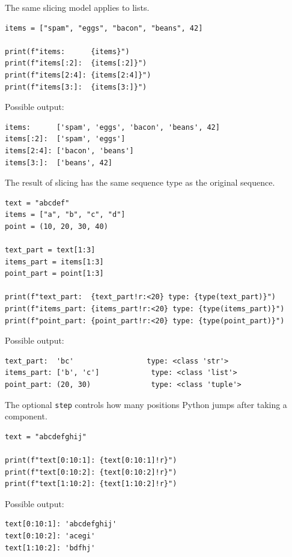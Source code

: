 The same slicing model applies to lists.

\begin{verbatim}
items = ["spam", "eggs", "bacon", "beans", 42]

print(f"items:      {items}")
print(f"items[:2]:  {items[:2]}")
print(f"items[2:4]: {items[2:4]}")
print(f"items[3:]:  {items[3:]}")
\end{verbatim}

Possible output:

\begin{verbatim}
items:      ['spam', 'eggs', 'bacon', 'beans', 42]
items[:2]:  ['spam', 'eggs']
items[2:4]: ['bacon', 'beans']
items[3:]:  ['beans', 42]
\end{verbatim}

The result of slicing has the same sequence type as the original sequence.

\begin{verbatim}
text = "abcdef"
items = ["a", "b", "c", "d"]
point = (10, 20, 30, 40)

text_part = text[1:3]
items_part = items[1:3]
point_part = point[1:3]

print(f"text_part:  {text_part!r:<20} type: {type(text_part)}")
print(f"items_part: {items_part!r:<20} type: {type(items_part)}")
print(f"point_part: {point_part!r:<20} type: {type(point_part)}")
\end{verbatim}

Possible output:

\begin{verbatim}
text_part:  'bc'                 type: <class 'str'>
items_part: ['b', 'c']            type: <class 'list'>
point_part: (20, 30)              type: <class 'tuple'>
\end{verbatim}

The optional \texttt{step} controls how many positions Python jumps after taking a component.

\begin{verbatim}
text = "abcdefghij"

print(f"text[0:10:1]: {text[0:10:1]!r}")
print(f"text[0:10:2]: {text[0:10:2]!r}")
print(f"text[1:10:2]: {text[1:10:2]!r}")
\end{verbatim}

Possible output:

\begin{verbatim}
text[0:10:1]: 'abcdefghij'
text[0:10:2]: 'acegi'
text[1:10:2]: 'bdfhj'
\end{verbatim}


